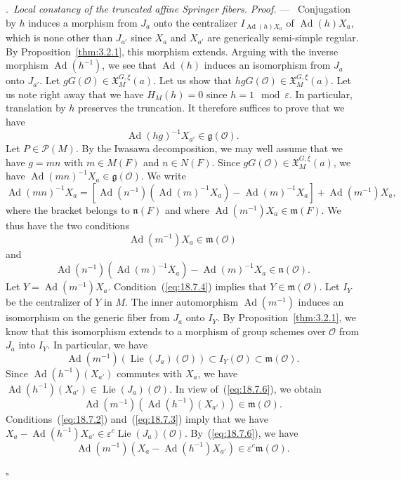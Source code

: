\documentclass[12pt,a4paper,oneside,english,leqno]{smfart}
\makeatletter
\numberwithin{equation}{subsection}
\numberwithin{theo}{subsection}
\newenvironment{paragr}[1][]{\medskip\refstepcounter{subsection}%
  \par\noindent\hspace*{\parindent}\thesubsection.\ \emph{#1}%
  \@ifundefined{@empty}{}{}\ignorespaces}{\medskip}
\theoremstyle{plain}
\theoremstyle{definition}
\theoremstyle{remark}
\newenvironment{preuve}[1][]{\medskip\noindent\textit{Proof.} #1 ---\ }%
  {\hfill\ensuremath{\square}\medskip}
\DeclareMathOperator{\Lie}{Lie}
\DeclareMathOperator{\Ad}{Ad}
\newcommand{\oc}{\mathcal{O}}
\newcommand{\pc}{\mathcal{P}}
\newcommand{\ggo}{\mathfrak{g}}
\newcommand{\mgo}{\mathfrak{m}}
\newcommand{\ngo}{\mathfrak{n}}
\newcommand{\Xgo}{\mathfrak{X}}
\newcommand{\eps}{\varepsilon}
\makeatother
\begin{document}
\begin{paragr}[Local constancy of the truncated affine Springer fibers.]
\begin{preuve}
Conjugation by $h$ induces a morphism from $J_a$ onto the centralizer $I_{\Ad(h)X_a}$ of $\Ad(h)X_a$, which is none other than $J_{a'}$ since $X_a$ and $X_{a'}$ are generically semi-simple regular. By Proposition~\ref{thm:3.2.1}, this morphism extends. Arguing with the inverse morphism $\Ad(h^{-1})$, we see that $\Ad(h)$ induces an isomorphism from $J_a$ onto $J_{a'}$. Let $gG(\oc)\in\Xgo_M^{G,\xi}(a)$. Let us show that $hgG(\oc)\in\Xgo_M^{G,\xi}(a)$. Let us note right away that we have $H_M(h)=0$ since $h=1\mod\eps$. In particular, translation by $h$ preserves the truncation. It therefore suffices to prove that we have
$$
\Ad(hg)^{-1}X_{a'}\in\ggo(\oc).
$$
Let $P\in\pc(M)$. By the Iwasawa decomposition, we may well assume that we have $g=mn$ with $m\in M(F)$ and $n\in N(F)$. Since $gG(\oc)\in\Xgo_M^{G,\xi}(a)$, we have $\Ad(mn)^{-1}X_a\in\ggo(\oc)$. We write
$$
\Ad(mn)^{-1}X_a=[\Ad(n^{-1})(\Ad(m)^{-1}X_a)-\Ad(m)^{-1}X_a]+\Ad(m^{-1})X_a,
$$
where the bracket belongs to $\ngo(F)$ and where $\Ad(m^{-1})X_a\in\mgo(F)$. We thus have the two conditions
\begin{equation}\label{eq:18.7.4}
\Ad(m^{-1})X_a\in\mgo(\oc)
\end{equation}
and
\begin{equation}\label{eq:18.7.5}
\Ad(n^{-1})(\Ad(m)^{-1}X_a)-\Ad(m)^{-1}X_a\in\ngo(\oc).
\end{equation}
Let $Y=\Ad(m^{-1})X_a$. Condition~(\ref{eq:18.7.4}) implies that $Y\in\mgo(\oc)$. Let $I_Y$ be the centralizer of $Y$ in $M$. The inner automorphism $\Ad(m^{-1})$ induces an isomorphism on the generic fiber from $J_a$ onto $I_Y$. By Proposition~\ref{thm:3.2.1}, we know that this isomorphism extends to a morphism of group schemes over $\oc$ from $J_a$ into $I_Y$. In particular, we have
\begin{equation}\label{eq:18.7.6}
\Ad(m^{-1})(\Lie(J_a)(\oc))\subset I_Y(\oc)\subset\mgo(\oc).
\end{equation}
Since $\Ad(h^{-1})(X_{a'})$ commutes with $X_a$, we have $\Ad(h^{-1})(X_{a'})\in\Lie(J_a)(\oc)$. In view of~(\ref{eq:18.7.6}), we obtain
\begin{equation}\label{eq:18.7.7}
\Ad(m^{-1})(\Ad(h^{-1})(X_{a'}))\in\mgo(\oc).
\end{equation}
Conditions~(\ref{eq:18.7.2}) and~(\ref{eq:18.7.3}) imply that we have $X_a-\Ad(h^{-1})X_{a'}\in\eps^c\Lie(J_a)(\oc)$. By~(\ref{eq:18.7.6}), we have
\begin{equation}\label{eq:18.7.8}
\Ad(m^{-1})(X_a-\Ad(h^{-1})X_{a'})\in\eps^c\mgo(\oc).
\end{equation}

\end{preuve}
\end{paragr}
\end{document}
